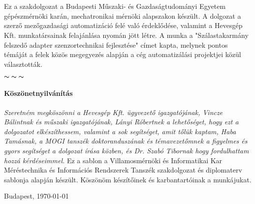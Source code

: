 \chapter*{\eloszo}

Ez a szakdolgozat a Budapesti Műszaki- és Gazdaságtudományi Egyetem gépészmérnöki karán, mechatronikai mérnöki alapszakon készült. A dolgozat a szerző mezőgazdasági automatizáció felé való érdeklődése, valamint a Hevesgép Kft. munkatársainak felajánlása nyomán jött létre. A munka a "Szálastakarmány felszedő adapter szenzortechnikai fejlesztése" címet kapta, melynek pontos témáját a felek közös megegyezés alapján a cég automatizálási projektjei közül választották.

\begin{center}
    $\thicksim \; \thicksim \; \thicksim$
\end{center}


\subsubsection*{Köszönetnyilvánítás}
\emph{Szeretném megköszönni a Hevesgép Kft. ügyvezető igazgatójának, Vincze Bálintnak és műszaki igazgatójának, Lányi Róbertnek a lehetőséget, hogy ezt a dolgozatot elkészíthessem, valamint a sok segítséget, amit tőlük kaptam, Haba Tamásnak, a MOGI tanszék doktoranduszának és témavezetőmnek a figyelmes és gyors segítséget a dolgozat írása közben, és Dr. Szabó Tibornak hogy fordulhattam hozzá kérdéseimmel.}
Ez a sablon a Villamosmérnöki és Informatikai Kar Méréstechnika és Információs Rendszerek Tanszék szakdolgozat és diplomaterv sablonja alapján készült. Köszönöm készítőinek és karbantartóinak a munkájukat.


\vspace{0.5cm}

\begin{flushleft}
{Budapest, \today}
\end{flushleft}

\begin{flushright}
\emph{\authorName}
\end{flushright}

\vfill
